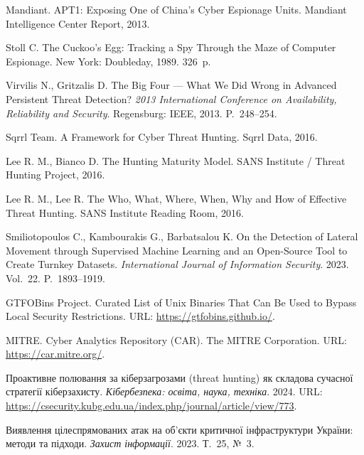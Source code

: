 
 Mandiant. APT1: Exposing One of China's Cyber Espionage Units. Mandiant Intelligence Center Report, 2013.

 Stoll C. The Cuckoo's Egg: Tracking a Spy Through the Maze of Computer Espionage. New York: Doubleday, 1989. 326~p.

 Virvilis N., Gritzalis D. The Big Four --- What We Did Wrong in Advanced Persistent Threat Detection? \emph{2013 International Conference on Availability, Reliability and Security}. Regensburg: IEEE, 2013. P.~248--254.

 Sqrrl Team. A Framework for Cyber Threat Hunting. Sqrrl Data, 2016.

 Lee R. M., Bianco D. The Hunting Maturity Model. SANS Institute / Threat Hunting Project, 2016.

 Lee R. M., Lee R. The Who, What, Where, When, Why and How of Effective Threat Hunting. SANS Institute Reading Room, 2016.

 Smiliotopoulos C., Kambourakis G., Barbatsalou K. On the Detection of Lateral Movement through Supervised Machine Learning and an Open-Source Tool to Create Turnkey Datasets. \emph{International Journal of Information Security}. 2023. Vol.~22. P.~1893--1919.

 GTFOBins Project. Curated List of Unix Binaries That Can Be Used to Bypass Local Security Restrictions. URL: \url{https://gtfobins.github.io/}.

 MITRE. Cyber Analytics Repository (CAR). The MITRE Corporation. URL: \url{https://car.mitre.org/}.

 Проактивне полювання за кіберзагрозами (threat hunting) як складова сучасної стратегії кіберзахисту. \emph{Кібербезпека: освіта, наука, техніка}. 2024. URL: \url{https://csecurity.kubg.edu.ua/index.php/journal/article/view/773}.

 Виявлення цілеспрямованих атак на об'єкти критичної інфраструктури України: методи та підходи. \emph{Захист інформації}. 2023. Т.~25, №~3.

